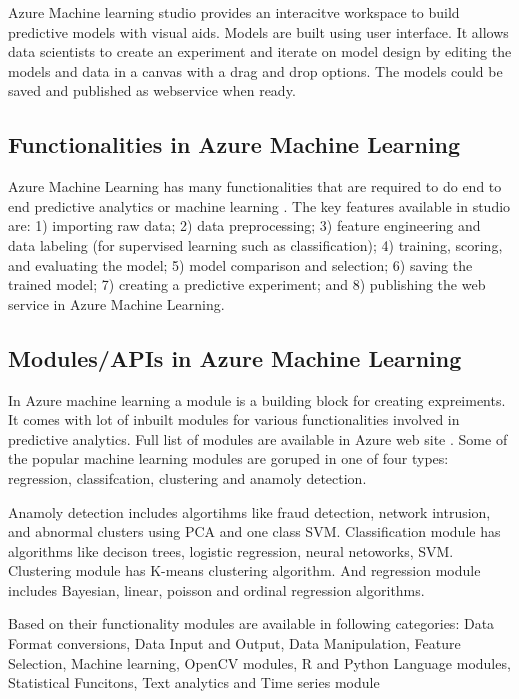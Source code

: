 \documentclass[9pt,twocolumn,twoside]{styles/osajnl}
\begin{document}
Azure Machine learning studio provides an interacitve workspace to
build predictive models with visual aids. Models are built using user
interface. It allows data scientists to create an experiment and
iterate on model design by editing the models and data in a canvas
with a drag and drop options.  The models could be saved and published
as webservice when ready. 

\subsection{Functionalities in Azure Machine Learning}

Azure Machine Learning has many functionalities that are required to
do end to end predictive analytics or machine
learning \cite{www-azureMLStudioCapabilities}. The key features
available in studio are: 1) importing raw data; 2) data preprocessing;
3) feature engineering and data labeling (for supervised learning such
as classification); 4) training, scoring, and evaluating the model; 5)
model comparison and selection; 6) saving the trained model; 7)
creating a predictive experiment; and 8) publishing the web service in
Azure Machine Learning.

\subsection{Modules/APIs in Azure Machine Learning}
In Azure machine learning a module is a building block for creating
expreiments. It comes with lot of inbuilt modules for various
functionalities involved in predictive analytics. Full list of modules
are available in Azure web site \cite{www-azureMLModules}. Some of the
popular machine learning modules are goruped in one of four types:
regression, classifcation, clustering and anamoly detection.

Anamoly detection includes algortihms like fraud detection, network
intrusion, and abnormal clusters using PCA and one class
SVM. Classification module has algorithms like decison trees, logistic
regression, neural netoworks, SVM. Clustering module has K-means
clustering algorithm. And regression module includes Bayesian, linear,
poisson and ordinal regression algorithms.

Based on their functionality modules are available in following
categories: Data Format conversions, Data Input and Output, Data
Manipulation, Feature Selection, Machine learning, OpenCV modules, R
and Python Language modules, Statistical Funcitons, Text analytics and
Time series module \cite{www-azureMLModuleCategories}
\end{document}
